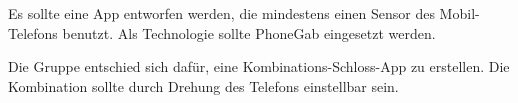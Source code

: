 Es sollte eine App entworfen werden, die mindestens einen Sensor des Mobil-Telefons benutzt. Als Technologie sollte PhoneGab eingesetzt werden.

Die Gruppe entschied sich dafür, eine Kombinations-Schloss-App zu erstellen. Die Kombination sollte durch Drehung des Telefons einstellbar sein.